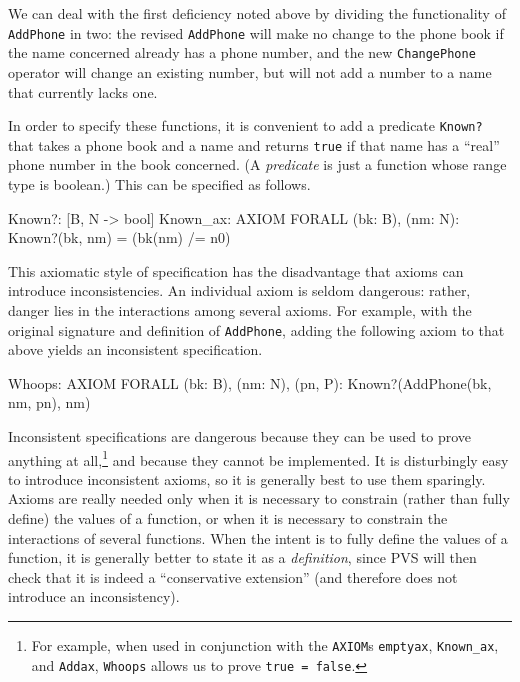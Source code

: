 We can deal with the first deficiency noted above by dividing the
functionality of {\tt AddPhone} in two: the revised {\tt AddPhone}
will make no change to the phone book if the name concerned already
has a phone number, and the new {\tt ChangePhone} operator will change
an existing number, but will not add a number to a name that
currently lacks one.

In order to specify these functions, it is convenient to add a
predicate {\tt Known?} that takes a phone book and a name and returns
{\tt true} if that name has a ``real'' phone number in the book
concerned.  (A {\em predicate\/} is just a function whose range type
is boolean.)  This can be specified as follows.
\begin{pvsexample}
Known?: [B, N -> bool]
Known_ax: AXIOM FORALL (bk: B), (nm: N): Known?(bk, nm) = (bk(nm) /= n0)
\end{pvsexample}

This axiomatic style of specification has the disadvantage that axioms
can introduce inconsistencies.  An individual axiom is seldom
dangerous: rather, danger lies in the interactions among several
axioms.  For example, with the original signature and definition of
{\tt AddPhone}, adding the following axiom to that above yields an
inconsistent specification.
\begin{pvsexample}
Whoops: AXIOM   FORALL (bk: B), (nm: N), (pn, P): Known?(AddPhone(bk, nm, pn), nm)
\end{pvsexample}

Inconsistent specifications are dangerous because they can be used to
prove anything at all,\footnote{For example, when used in conjunction
with the {\tt AXIOM}s {\tt emptyax}, {\tt Known\_ax}, and {\tt Addax},
{\tt Whoops} allows us to prove {\tt true = false}.}
and because they cannot be implemented.  It is
disturbingly easy to introduce inconsistent axioms, so it is generally
best to use them sparingly.  Axioms are really needed only when it is
necessary to constrain (rather than fully define) the values of a
function, or when it is necessary to constrain the interactions of
several functions.  When the intent is to fully define the values of
a function, it is generally better to state it as a {\em definition\/},
since PVS will then check that it is indeed a ``conservative
extension'' (and therefore does not introduce an inconsistency).

